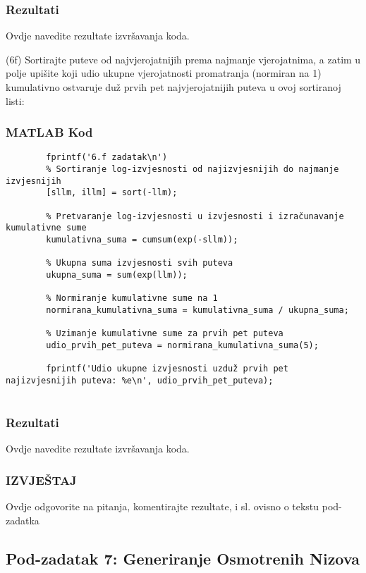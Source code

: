\documentclass[12pt]{article}
\begin{document}
	\subsubsection*{Rezultati}
	Ovdje navedite rezultate izvršavanja koda.\newline
	
	(6f) Sortirajte puteve od najvjerojatnijih prema najmanje vjerojatnima, a zatim u polje upišite koji udio ukupne vjerojatnosti promatranja (normiran na 1) kumulativno ostvaruje duž prvih pet najvjerojatnijih puteva u ovoj sortiranoj listi:
	\subsubsection*{MATLAB Kod}
	\begin{lstlisting}
		fprintf('6.f zadatak\n')
		% Sortiranje log-izvjesnosti od najizvjesnijih do najmanje izvjesnijih
		[sllm, illm] = sort(-llm);
		
		% Pretvaranje log-izvjesnosti u izvjesnosti i izračunavanje kumulativne sume
		kumulativna_suma = cumsum(exp(-sllm));
		
		% Ukupna suma izvjesnosti svih puteva
		ukupna_suma = sum(exp(llm));
		
		% Normiranje kumulativne sume na 1
		normirana_kumulativna_suma = kumulativna_suma / ukupna_suma;
		
		% Uzimanje kumulativne sume za prvih pet puteva
		udio_prvih_pet_puteva = normirana_kumulativna_suma(5);
		
		fprintf('Udio ukupne izvjesnosti uzduž prvih pet najizvjesnijih puteva: %e\n', udio_prvih_pet_puteva);
		
	\end{lstlisting}
	
	\subsubsection*{Rezultati}
	Ovdje navedite rezultate izvršavanja koda.
	
	\subsubsection*{IZVJEŠTAJ}
	Ovdje odgovorite na pitanja, komentirajte rezultate, i sl. ovisno o tekstu pod-zadatka
	
	\subsection{Pod-zadatak 7: Generiranje Osmotrenih Nizova}
	
\end{document}
